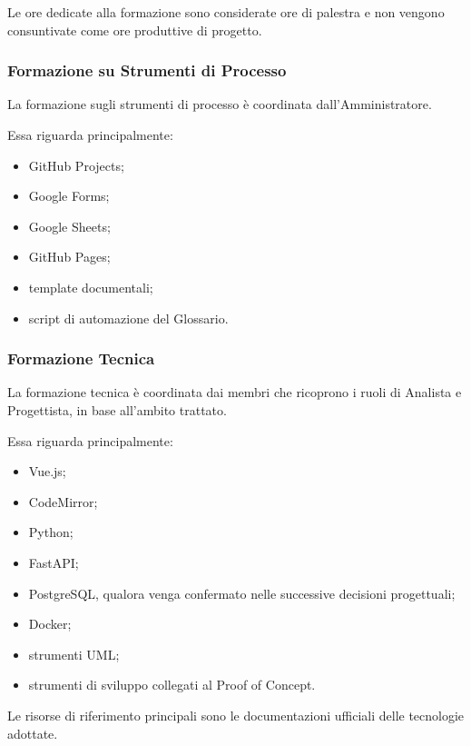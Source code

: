 Le ore dedicate alla formazione sono considerate ore di palestra e non vengono
consuntivate come ore produttive di progetto.


\subsubsection{Formazione su Strumenti di Processo}

La formazione sugli strumenti di processo è coordinata dall'Amministratore.

Essa riguarda principalmente:

\begin{itemize}
    \item GitHub Projects;
    \item Google Forms;
    \item Google Sheets;
    \item GitHub Pages;
    \item template documentali;
    \item script di automazione del Glossario.
\end{itemize}


\subsubsection{Formazione Tecnica}

La formazione tecnica è coordinata dai membri che ricoprono i ruoli di Analista e
Progettista, in base all'ambito trattato.

Essa riguarda principalmente:

\begin{itemize}
    \item Vue.js;
    \item CodeMirror;
    \item Python;
    \item FastAPI;
    \item PostgreSQL, qualora venga confermato nelle successive decisioni progettuali;
    \item Docker;
    \item strumenti UML;
    \item strumenti di sviluppo collegati al Proof of Concept.
\end{itemize}

Le risorse di riferimento principali sono le documentazioni ufficiali delle
tecnologie adottate.

